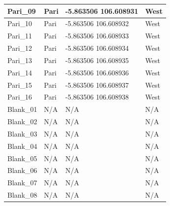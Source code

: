\documentclass[
]{article}
\begin{document}
\begin{table}
\begin{tabular}{l|l|l|l}
\hline
Pari\_09 & Pari & -5.863506 106.608931 & West\\
\hline
Pari\_10 & Pari & -5.863506 106.608932 & West\\
\hline
Pari\_11 & Pari & -5.863506 106.608933 & West\\
\hline
Pari\_12 & Pari & -5.863506 106.608934 & West\\
\hline
Pari\_13 & Pari & -5.863506 106.608935 & West\\
\hline
Pari\_14 & Pari & -5.863506 106.608936 & West\\
\hline
Pari\_15 & Pari & -5.863506 106.608937 & West\\
\hline
Pari\_16 & Pari & -5.863506 106.608938 & West\\
\hline
Blank\_01 & N/A & N/A & N/A\\
\hline
Blank\_02 & N/A & N/A & N/A\\
\hline
Blank\_03 & N/A & N/A & N/A\\
\hline
Blank\_04 & N/A & N/A & N/A\\
\hline
Blank\_05 & N/A & N/A & N/A\\
\hline
Blank\_06 & N/A & N/A & N/A\\
\hline
Blank\_07 & N/A & N/A & N/A\\
\hline
Blank\_08 & N/A & N/A & N/A\\
\hline
\end{tabular}
\end{table}
\end{document}
